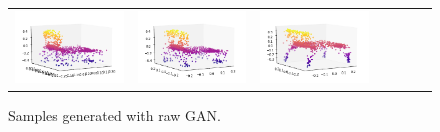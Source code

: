 \documentclass[12pt]{article}
\begin{document}
    \begin{figure}
        \centering
        \begin{tabular}{lllllll}
            \includegraphics[width = 30mm]{chair_raw_gen_1} &
            \includegraphics[width = 30mm]{chair_raw_gen_2} &
            \includegraphics[width = 30mm]{chair_raw_gen_3} \\
        \end{tabular}
        \caption{Samples generated with raw GAN.}
        \label{figure:samples_generated_with_raw_gan}
    \end{figure}
\end{document}

